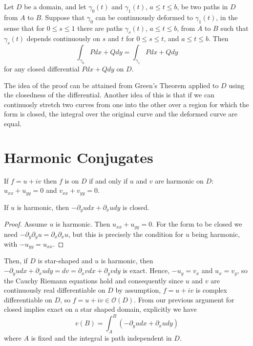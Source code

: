 \documentclass[12pt, a4paper, oneside, openright, titlepage]{book}
\begin{document}
\begin{thm}
    Let $D$ be a domain, and let $\gamma_0(t)$ and $\gamma_1(t)$, $a \leq t \leq b$, be two paths in $D$ from $A$ to $B$. Suppose that $\gamma_0$ can be continuously deformed to $\gamma_1(t)$, in the sense that for $0 \leq s \leq 1$ there are paths $\gamma_s(t)$, $a \leq t \leq b$, from $A$ to $B$ such that $\gamma_s(t)$ depends continuously on $s$ and $t$ for $0 \leq s \leq t$, and $a \leq t \leq b$. Then \begin{equation*}
        \int_{\gamma_0}Pdx+Qdy = \int_{\gamma_1}Pdx+Qdy
    \end{equation*}
    for any closed differential $Pdx+Qdy$ on $D$.
\end{thm}

The idea of the proof can be attained from Green's Theorem applied to $D$ using the closedness of the differential. Another idea of this is that if we can continuosly stretch two curves from one into the other over a region for which the form is closed, the integral over the original curve and the deformed curve are equal.


\section{Harmonic Conjugates}

\begin{rec}
    If $f= u+iv$ then $f$ is  on $D$ if and only if $u$ and $v$ are harmonic on $D$: $u_{xx}+u_{yy} = 0$ and $v_{xx}+v_{yy}=0$.
\end{rec}


\begin{lem}
    If $u$ is harmonic, then $-\partial_yudx + \partial_xudy$ is closed.
\end{lem}
\begin{proof}
    Assume $u$ is harmonic. Then $u_{xx}+u_{yy} = 0$. For the form to be closed we need $-\partial_y\partial_yu = \partial_x\partial_xu$, but this is precisely the condition for $u$ being harmonic, with $-u_{yy} = u_{xx}$.
\end{proof}

Then, if $D$ is star-shaped and $u$ is harmonic, then $-\partial_yudx+\partial_xudy = dv = \partial_xvdx+\partial_yvdy$ is exact. Hence, $-u_y = v_x$ and $u_x = v_y$, so the Cauchy Riemann equations hold and consequently since $u$ and $v$ are continuously real differentiable on $D$ by assumption, $f = u+iv$ is complex differentiable on $D$, so $f = u+iv \in \mathcal{O}(D)$. From our previous argument for closed implies exact on a star shaped domain, explicitly we have \begin{equation*}
    v(B) = \int_A^B(-\partial_yudx+\partial_xudy)
\end{equation*}
where $A$ is fixed and the integral is path independent in $D$.
\end{document}
